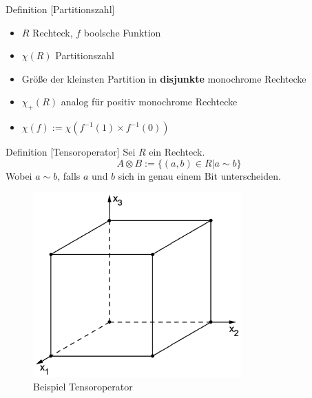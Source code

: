 \begin{frame}
    \begin{block}{Definition [Partitionszahl]}
        \begin{itemize}
            \item $R$ Rechteck, $f$ boolsche Funktion
            \item $\chi(R)$ Partitionszahl
            \item Größe der kleinsten Partition in \textbf{disjunkte} monochrome Rechtecke
            \item $\chi_+(R)$ analog für positiv monochrome Rechtecke
            \item $\chi (f) := \chi (f^{-1}(1) \times f^{-1}(0))$
        \end{itemize}
        
    \end{block}
\end{frame}

\begin{frame}
    \begin{block}{Definition [Tensoroperator]}
        Sei $R$ ein Rechteck.
        \[
            A \otimes B := \{ (a,b) \in R \vert a \sim b\}
        \]
        Wobei $a \sim b$, falls $a$ und $b$ sich in genau einem Bit unterscheiden.
    \end{block}
\end{frame}

\begin{frame}
    \begin{figure}
        \centering
        \includegraphics[width=80mm,scale=0.5]{wuerfel.png}
        \caption{Beispiel Tensoroperator}
    \end{figure}
\end{frame}

